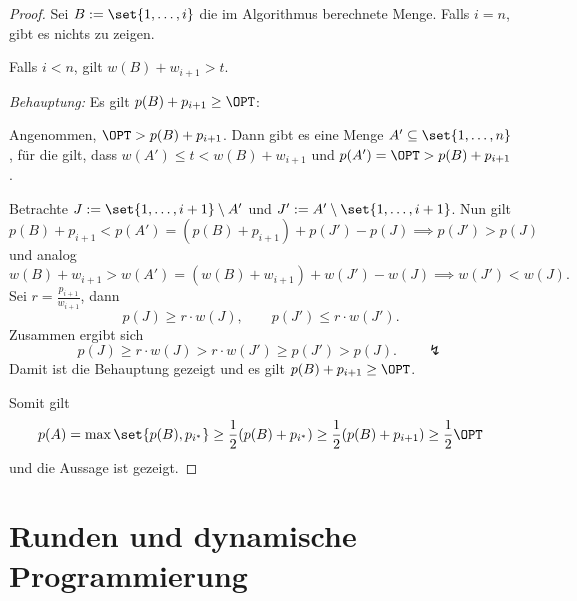 \documentclass[language=ngerman,algolist]{TemplateLecture}
\begin{document}
\begin{proof}
    Sei $B := \set{1,\ldots,i}$ die im Algorithmus berechnete Menge. Falls $i = n$, gibt es nichts zu zeigen.

    Falls $i < n$, gilt $w(B) + w_{i+1} > t$. 

    \emph{Behauptung:} Es gilt $p(B) + p_{i+1} \geq \OPT$:

    Angenommen, $\OPT > p(B) + p_{i+1}$. Dann gibt es eine Menge $A' \subseteq \set{1,\ldots,n}$, für die gilt, dass $w(A') \leq t < w(B) + w_{i+1}$ und $p(A') = \OPT > p(B) + p_{i+1}$. 
    
    Betrachte $J := \set{1,\ldots,i+1} \setminus A'$ und $J' := A' \setminus \set{1,\ldots,i+1}$. Nun gilt 
    \begin{equation*}
        p(B) + p_{i+1} < p(A') = (p(B) + p_{i+1}) + p(J') - p(J) \implies p(J') > p(J)
    \end{equation*}
    und analog
    \begin{equation*}
        w(B) + w_{i+1} > w(A') = (w(B) + w_{i+1}) + w(J') - w(J) \implies w(J') < w(J).
    \end{equation*}
    Sei $r = \frac{p_{i+1}}{w_{i+1}}$, dann 
    \begin{equation*}
        p(J) \geq r \cdot w(J), \quad \quad p(J') \leq r \cdot w(J').
    \end{equation*}
    Zusammen ergibt sich 
    \begin{equation*}
        p(J) \geq r \cdot w(J) > r \cdot w(J') \geq p(J') > p(J). \quad \quad \lightning
    \end{equation*}
    Damit ist die Behauptung gezeigt und es gilt $p(B) + p_{i+1} \geq \OPT$.

    Somit gilt 
    \begin{equation*}
        p(A) = \max\set{p(B), p_{i^*}} \geq \frac{1}{2}(p(B) + p_{i^*}) \geq \frac{1}{2}(p(B) + p_{i+1}) \geq \frac{1}{2}\OPT
    \end{equation*}
    und die Aussage ist gezeigt.
\end{proof}


\chapter{Runden und dynamische Programmierung}
\end{document}

